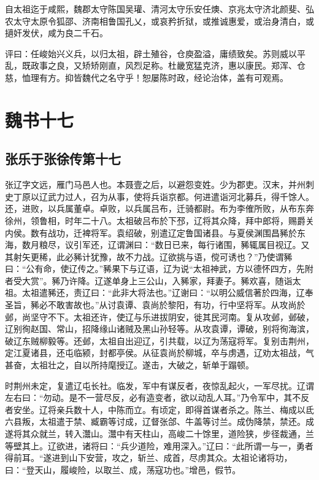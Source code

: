 \documentclass[12pt,UTF8]{ctexbook}
\begin{document}
自太祖迄于咸熙，魏郡太守陈国吴瓘、清河太守乐安任燠、京兆太守济北颜斐、弘农太守太原令狐邵、济南相鲁国孔乂，或哀矜折狱，或推诚惠爱，或治身清白，或擿奸发伏，咸为良二千石。

评曰：任峻始兴义兵，以归太祖，辟土殖谷，仓庾盈溢，庸绩致矣。苏则威以平乱，既政事之良，又矫矫刚直，风烈足称。杜畿宽猛克济，惠以康民。郑浑、仓慈，恤理有方。抑皆魏代之名守乎！恕屡陈时政，经论治体，盖有可观焉。

\part{魏书十七}
\chapter{张乐于张徐传第十七}

张辽字文远，雁门马邑人也。本聂壹之后，以避怨变姓。少为郡吏。汉末，并州刺史丁原以辽武力过人，召为从事，使将兵诣京都。何进遣诣河北募兵，得千馀人。还，进败，以兵属董卓。卓败，以兵属吕布，迁骑都尉。布为李傕所败，从布东奔徐州，领鲁相，时年二十八。太祖破吕布於下邳，辽将其众降，拜中郎将，赐爵关内侯。数有战功，迁裨将军。袁绍破，别遣辽定鲁国诸县。与夏侯渊围昌豨於东海，数月粮尽，议引军还，辽谓渊曰：“数日已来，每行诸围，豨辄属目视辽。又其射矢更稀，此必豨计犹豫，故不力战。辽欲挑与语，傥可诱也？”乃使谓豨曰：“公有命，使辽传之。”豨果下与辽语，辽为说“太祖神武，方以德怀四方，先附者受大赏”。豨乃许降。辽遂单身上三公山，入豨家，拜妻子。豨欢喜，随诣太祖。太祖遣豨还，责辽曰：“此非大将法也。”辽谢曰：“以明公威信著於四海，辽奉圣旨，豨必不敢害故也。”从讨袁谭、袁尚於黎阳，有功，行中坚将军。从攻尚於邺，尚坚守不下。太祖还许，使辽与乐进拔阴安，徙其民河南。复从攻邺，邺破，辽别徇赵国、常山，招降缘山诸贼及黑山孙轻等。从攻袁谭，谭破，别将徇海滨，破辽东贼柳毅等。还邺，太祖自出迎辽，引共载，以辽为荡寇将军。复别击荆州，定江夏诸县，还屯临颍，封都亭侯。从征袁尚於柳城，卒与虏遇，辽劝太祖战，气甚奋，太祖壮之，自以所持麾授辽。遂击，大破之，斩单于蹋顿。

时荆州未定，复遣辽屯长社。临发，军中有谋反者，夜惊乱起火，一军尽扰。辽谓左右曰：“勿动。是不一营尽反，必有造变者，欲以动乱人耳。”乃令军中，其不反者安坐。辽将亲兵数十人，中陈而立。有顷定，即得首谋者杀之。陈兰、梅成以氐六县叛，太祖遣于禁、臧霸等讨成，辽督张郃、牛盖等讨兰。成伪降禁，禁还。成遂将其众就兰，转入灊山。灊中有天柱山，高峻二十馀里，道险狭，步径裁通，兰等壁其上。辽欲进，诸将曰：“兵少道险，难用深入。”辽曰：“此所谓一与一，勇者得前耳。“遂进到山下安营，攻之，斩兰、成首，尽虏其众。太祖论诸将功，曰：“登天山，履峻险，以取兰、成，荡寇功也。”增邑，假节。
\end{document}
